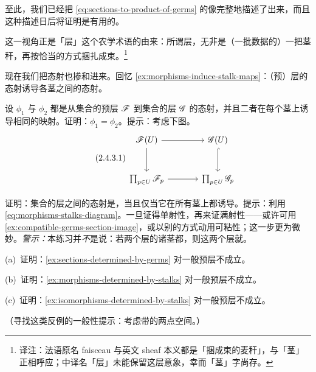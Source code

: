 至此，我们已经把 \eqref{eq:sections-to-product-of-germs} 的像完整地描述了出来，而且这种描述日后将证明是有用的。

\begin{remark}\label{thm:sheaf-name-origin}
这一视角正是「层」这个农学术语的由来：所谓层，无非是（一批数据的）一把茎秆，再按恰当的方式捆扎成束。\footnote{译注：法语原名 faisceau 与英文 sheaf 本义都是「捆成束的麦秆」，与「茎」正相呼应；中译名「层」未能保留这层意象，幸而「茎」字尚存。}
\end{remark}

现在我们把态射也掺和进来。回忆 \cref{ex:morphisms-induce-stalk-maps}：（预）层的态射诱导各茎之间的态射。

\begin{exercise}[态射由茎确定]\label{ex:morphisms-determined-by-stalks}
设 $\phi_1$ 与 $\phi_2$ 都是从集合的预层 $\mathscr{F}$ 到集合的层 $\mathscr{G}$ 的态射，并且二者在每个茎上诱导相同的映射。证明：$\phi_1=\phi_2$。提示：考虑下图。
\begin{equation*}\tag{2.4.3.1}\label{eq:morphisms-stalks-diagram}
\begin{tikzcd}[row sep=2.8em, column sep=3.6em]
\scr{F}(U) \ar[r] \ar[d] & \scr{G}(U) \ar[d, hook] \\
\prod_{p\in U}\scr{F}_p \ar[r] & \prod_{p\in U}\scr{G}_p
\end{tikzcd}
\end{equation*}
\end{exercise}

\begin{exercise}\label{ex:isomorphisms-determined-by-stalks}
证明：集合的层之间的态射是\trIsomorphism，当且仅当它在所有茎上都诱导\trIsomorphism。提示：利用 \eqref{eq:morphisms-stalks-diagram}。一旦证得单射性，再来证满射性——或许可用 \cref{ex:compatible-germs-section-image}，或以别的方式动用可粘性；这一步更为微妙。\emph{警示：}本练习并\emph{不}是说：若两个层的诸茎都\trIsomorphic，则这两个层就\trIsomorphic。
\end{exercise}

\begin{exercise}\label{ex:counterexamples-for-presheaves}
(a)~证明：\cref{ex:sections-determined-by-germs} 对一般预层不成立。

(b)~证明：\cref{ex:morphisms-determined-by-stalks} 对一般预层不成立。

(c)~证明：\cref{ex:isomorphisms-determined-by-stalks} 对一般预层不成立。

（寻找这类反例的一般性提示：考虑带\trDiscreteTopology{}的两点空间。）
\end{exercise}

